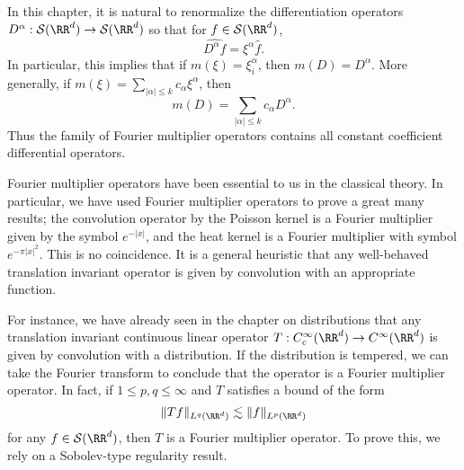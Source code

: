 \begin{example}
  In this chapter, it is natural to renormalize the differentiation operators $D^\alpha: \mathcal{S}(\RR^d) \to \mathcal{S}(\RR^d)$ so that for $f \in \mathcal{S}(\RR^d)$,
  \[ \widehat{D^\alpha f} = \xi^\alpha \widehat{f}. \]
  In particular, this implies that if $m(\xi) = \xi_i^\alpha$, then $m(D) = D^\alpha$. More generally, if $m(\xi) = \sum_{|\alpha| \leq k} c_\alpha \xi^\alpha$, then
  \[ m(D) = \sum_{|\alpha| \leq k} c_\alpha D^\alpha. \]
  Thus the family of Fourier multiplier operators contains all constant coefficient differential operators.
\end{example}

Fourier multiplier operators have been essential to us in the classical theory. In particular, we have used Fourier multiplier operators to prove a great many results; the convolution operator by the Poisson kernel is a Fourier multiplier given by the symbol $e^{-|x|}$, and the heat kernel is a Fourier multiplier with symbol $e^{- \pi |x|^2}$. This is no coincidence. It is a general heuristic that any well-behaved translation invariant operator is given by convolution with an appropriate function.

For instance, we have already seen in the chapter on distributions that any translation invariant continuous linear operator $T: C_c^\infty(\RR^d) \to C^\infty(\RR^d)$ is given by convolution with a distribution. If the distribution is tempered, we can take the Fourier transform to conclude that the operator is a Fourier multiplier operator. In fact, if $1 \leq p,q \leq \infty$ and $T$ satisfies a bound of the form
%
\[ \| Tf \|_{L^q(\RR^d)} \lesssim \| f \|_{L^p(\RR^d)} \]
%
for any $f \in \mathcal{S}(\RR^d)$, then $T$ is a Fourier multiplier operator. To prove this, we rely on a Sobolev-type regularity result.

